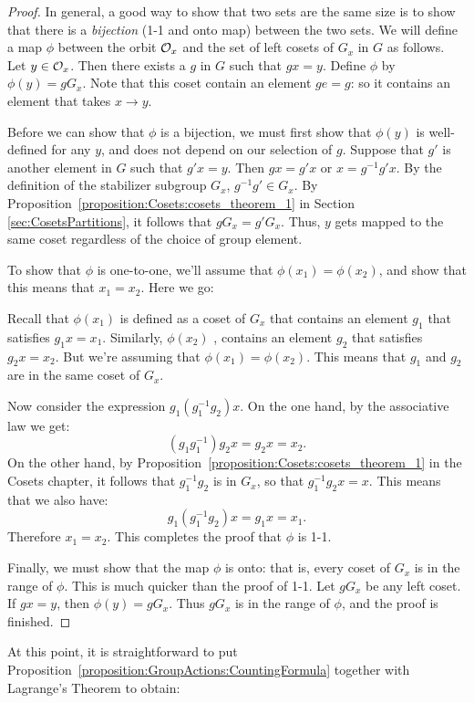 \begin{proof}
In general, a good way to show that two sets are the same size is to show that there is a \emph{bijection} (1-1 and onto map) between the two sets.  
 We will define a map $\phi$
between the orbit ${\cal O}_x$ and the set of left cosets of $G_x$ in $G$ as follows. Let $y \in {\cal O}_x$. Then there 
exists a $g$ in $G$ such that $g x = y$. Define $\phi$ by $\phi( y ) 
= g G_x$. Note that this coset contain an element $ge=g$:  so it contains an element that takes $x\rightarrow y$.  

Before we can show that $\phi$ is a bijection, we must first show that $\phi(y)$ is well-defined for any $y$, and does 
not depend on our selection of $g$. Suppose that $g'$ is another 
element in $G$ such that $g'x = y$. Then $g x = g' x$ or $x= g^{-1} g' x$. 
By the definition of the stabilizer subgroup $G_x$, $g^{-1}g'\in G_x$. By Proposition~\ref{proposition:Cosets:cosets_theorem_1} in Section \ref{sec:CosetsPartitions}, it follows that 
 $g G_x = g' G_x$. Thus, $y$ gets mapped to the same 
coset regardless of the choice of group element.


To show that $\phi$ is one-to-one, we'll assume that $\phi(x_1) =
\phi(x_2)$, and show that this means that $x_1=x_2$. Here we go: 

Recall that $\phi(x_1)$ is defined as a coset of $G_x$ that contains an element $g_1$ that satisfies $g_1x=x_1.$   Similarly,  $\phi(x_2)$ , contains  an element $g_2$ that satisfies $g_2x=x_2$. But we're assuming that $\phi(x_1) =
\phi(x_2)$.  This means that $g_1$ and $g_2$ are in the same coset of $G_x$.  

Now consider the expression $g_1(g_1^{-1}g_2)x$. On the one hand, by the associative law we get:
$$(g_1g_1^{-1})g_2x=g_2x=x_2.$$ 
 On the other hand, by Proposition~\ref{proposition:Cosets:cosets_theorem_1} in the Cosets chapter, it follows that $g_1^{-1}g_2$ is in $G_x$, so that $g_1^{-1}g_2x=x$.  This means that we also have:
$$g_1(g_1^{-1}g_2)x=g_1x=x_1.$$
  Therefore $x_1=x_2$.  This completes the proof that $\phi$ is 1-1.

Finally, we must show
that the map $\phi$ is onto: that is, every coset of $G_x$ is in the range of $\phi$. This is much quicker than the proof of 1-1. 
Let $g G_x$ be any  left coset. If $g x =y$, then $\phi(y) = g G_x$.  Thus $gG_x$ is in the range of $\phi$, and the proof is finished.
\end{proof}

At this point, it is straightforward to  put Proposition~\ref{proposition:GroupActions:CountingFormula} together with Lagrange's Theorem to obtain:

